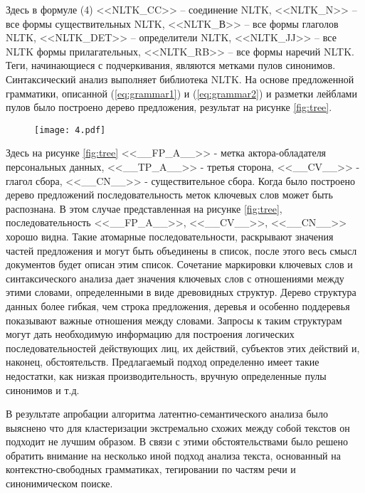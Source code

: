 \documentclass[../main]{subfiles}
\begin{document}
Здесь в формуле (4) <<NLTK\_CC>> -- соединение NLTK, <<NLTK\_N>> -- все формы существительных NLTK, <<NLTK\_В>> -- все формы глаголов NLTK, <<NLTK\_DET>> -- определители NLTK, <<NLTK\_JJ>> -- все NLTK формы прилагательных, <<NLTK\_RB>> -- все формы наречий NLTK. Теги, начинающиеся с подчеркивания, являются метками пулов синонимов. Синтаксический анализ выполняет библиотека NLTK. На основе предложенной грамматики, описанной (\ref{eq:grammar1}) и (\ref{eq:grammar2}) и разметки лейблами пулов было построено дерево предложения, результат на рисунке \ref{fig:tree}.

\begin{figure}[H]
    \centering
    {\texttt{[image: 4.pdf]}}
    \vspace{-\baselineskip}
\end{figure}

Здесь на рисунке \ref{fig:tree} <<\_\_FP\_A\_\_>> - метка актора-обладателя персональных данных, <<\_\_TP\_A\_\_>> - третья сторона, <<\_\_CV\_\_>> - глагол сбора, <<\_\_CN\_\_>> - существительное сбора. Когда было построено дерево предложений последовательность меток ключевых слов может быть распознана. В этом случае представленная на рисунке \ref{fig:tree}, последовательность <<\_\_FP\_A\_\_>>, <<\_\_CV\_\_>>, <<\_\_CN\_\_>> хорошо видна. Такие атомарные последовательности, раскрывают значения частей предложения и могут быть объединены в список, после этого весь смысл документов будет описан этим список. Сочетание маркировки ключевых слов и синтаксического анализа дает значения ключевых слов с отношениями между этими словами, определенными в виде древовидных структур. Дерево структура данных более гибкая, чем строка предложения, деревья и особенно поддеревья показывают важные отношения между словами. Запросы к таким структурам могут дать необходимую информацию для построения логических последовательностей действующих лиц, их действий, субъектов этих действий и, наконец, обстоятельств. Предлагаемый подход определенно имеет такие недостатки, как низкая производительность, вручную определенные пулы синонимов и т.д.


В результате апробации алгоритма латентно-семантического анализа было выяснено что для кластеризации экстремально схожих между собой текстов он  подходит не лучшим образом. В связи с этими обстоятельствами было решено обратить внимание на несколько иной подход анализа текста, основанный на контекстно-свободных грамматиках, тегировании по частям речи и синонимическом поиске.
\end{document}
